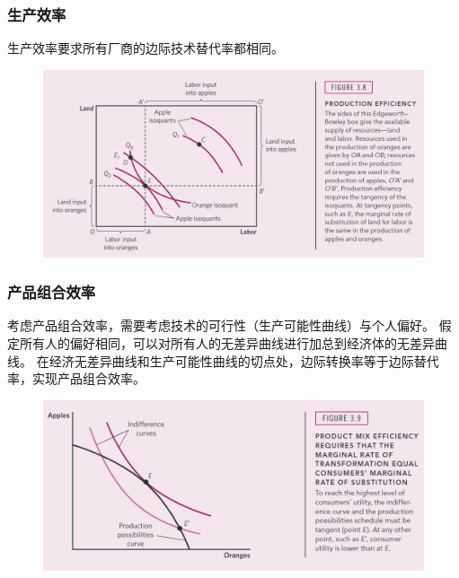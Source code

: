 \documentclass[aspectratio=169, 12pt]{beamer}
\begin{document}
\begin{frame}[plain]
    \frametitle{生产效率}
    生产效率要求所有厂商的边际技术替代率都相同。
    \begin{figure}
        \centering
        \begin{minipage}{1.0\linewidth}
            \centering
            \includegraphics[width=1.0\textwidth]{./resources/figure/proeff.png}
        \end{minipage}
    \end{figure}
\end{frame}

\begin{frame}[plain]
    \frametitle{产品组合效率}
    考虑产品组合效率，需要考虑技术的可行性（生产可能性曲线）与个人偏好。
    假定所有人的偏好相同，可以对所有人的无差异曲线进行加总到经济体的无差异曲线。
    在经济无差异曲线和生产可能性曲线的切点处，边际转换率等于边际替代率，实现产品组合效率。
    \begin{figure}
        \centering
        \begin{minipage}{1.0\linewidth}
            \centering
            \includegraphics[width=1.0\textwidth]{./resources/figure/promixeff.png}
        \end{minipage}
    \end{figure}
\end{frame}
\end{document}
